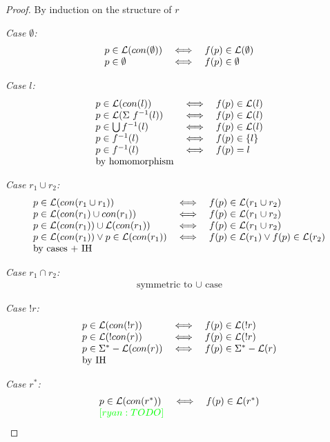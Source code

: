 \documentclass[twocolumn]{sig-alternate-10pt}
\newcommand{\ryan}[1]{\textcolor{green}{[ryan: #1]}}
\begin{document}
\begin{proof}
By induction on the structure of $r$

\emph{Case $\emptyset$:}
  \[ \begin{array}{lll}
    p \in \mathcal{L}(con(\emptyset)) &\iff& f(p) \in \mathcal{L}(\emptyset) \\
    p \in \emptyset &\iff& f(p) \in \emptyset \\
  \end{array} \]

\emph{Case $l$:}
  \[ \begin{array}{lll}
    p \in \mathcal{L}(con(l)) &\iff& f(p) \in \mathcal{L}(l) \\
    p \in \mathcal{L}(\Sigma ~ f^{-1}(l)) &\iff& f(p) \in \mathcal{L}(l) \\
    p \in \bigcup f^{-1}(l) &\iff& f(p) \in \mathcal{L}(l) \\
    p \in f^{-1}(l) &\iff& f(p) \in \{ l \} \\
    p \in f^{-1}(l) &\iff& f(p) = l \\
    \text{by homomorphism} & & \\
  \end{array} \]

\emph{Case $r_1 \cup r_2$:}
  \[ \begin{array}{lll}
    p \in \mathcal{L}(con(r_1 \cup r_1)) &\iff& f(p) \in \mathcal{L}(r_1 \cup r_2) \\
    p \in \mathcal{L}(con(r_1) \cup con(r_1)) &\iff& f(p) \in \mathcal{L}(r_1 \cup r_2) \\
    p \in \mathcal{L}(con(r_1)) \cup \mathcal{L}(con(r_1)) &\iff& f(p) \in \mathcal{L}(r_1 \cup r_2) \\
    p \in \mathcal{L}(con(r_1)) \vee p \in \mathcal{L}(con(r_1)) 
       &\iff& 
       f(p) \in \mathcal{L}(r_1) \vee f(p) \in \mathcal{L}(r_2) \\
    \text{by cases + IH} & & \\
  \end{array} \]

\emph{Case $r_1 \cap r_2$:} 
  \[ \begin{array}{c}
    \text{symmetric to } \cup \text{ case}
  \end{array} \]

\emph{Case $!r$:}
  \[ \begin{array}{lll}
    p \in \mathcal{L}(con(!r)) &\iff& f(p) \in \mathcal{L}(!r) \\
    p \in \mathcal{L}(!con(r)) &\iff& f(p) \in \mathcal{L}(!r) \\
    p \in \Sigma^* - \mathcal{L}(con(r)) &\iff& f(p) \in \Sigma^* - \mathcal{L}(r) \\
    \text{by IH} & & \\
  \end{array} \]

\emph{Case $r^*$:}
  \[ \begin{array}{lll}
    p \in \Lang(con(r^*)) &\iff& f(p) \in \Lang(r^*) \\
    \ryan{TODO} & & \\
  \end{array} \]

\end{proof}
\end{document}
